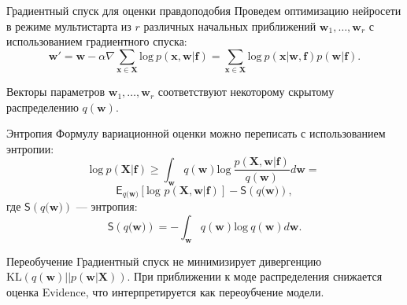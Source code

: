 \documentclass[10pt,pdf,utf8,russian,aspectratio=169]{beamer}
\begin{document}
\begin{frame}{Градиентный спуск для оценки правдоподобия}
Проведем оптимизацию нейросети в режиме мультистарта из $r$ различных начальных приближений $\mathbf{w}_1, \dots, \mathbf{w}_r$ с использованием градиентного спуска:
\[
\mathbf{w}' = \mathbf{w} - \alpha  \nabla \sum_{\mathbf{x} \in \mathbf{X}} \text{log}~p(\mathbf{x},\mathbf{w}|\mathbf{f}) = \sum_{\mathbf{x} \in \mathbf{X}} \text{log}~p(\mathbf{x}|\mathbf{w}, \mathbf{f}) p(\mathbf{w}|\mathbf{f}).
\]

Векторы параметров $\mathbf{w}_1,\dots,\mathbf{w}_r$ соответствуют некоторому скрытому распределению $q(\mathbf{w})$.

\end{frame}

\begin{frame}{Энтропия}
Формулу вариационной оценки можно переписать с использованием энтропии:
$$\text{log}~p(\mathbf{X}|\mathbf{f}) \geq 
\int_{\mathbf{w}} q(\mathbf{w})\text{log}~\frac{p(\mathbf{X},\mathbf{w}|\mathbf{f})}{q(\mathbf{w})}d\mathbf{w} = 
$$
$$
\mathsf{E}_{q(\mathbf{w)}}[\text{log~}p (\mathbf{X}, \mathbf{w}| \mathbf{f})] - \mathsf{S}({q(\mathbf{w)}}),
$$
где $\mathsf{S}({q(\mathbf{w)}})$ --- энтропия:
$$
\mathsf{S}({q(\mathbf{w)}}) = - \int_{\mathbf{w}} q(\mathbf{w})\text{log}~q(\mathbf{w})d\mathbf{w}.  	
$$


\end{frame}



\begin{frame}{Переобучение}
Градиентный спуск не минимизирует дивергенцию $\text{KL}(q(\mathbf{w})||p(\mathbf{w}| \mathbf{X}))$. При приближении к моде распределения снижается оценка Evidence, что интерпретируется как переоубчение модели.

\begin{figure}
  \centering
\label{fig:1}\qquad
\end{figure}
\end{frame}
\end{document}
